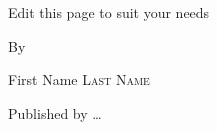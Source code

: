 \thispagestyle{empty} %

\begin{titlepage}
\null%
\vspace{3em}%
\begin{center}

\vspace*{4\baselineskip}

{\makeatletter
\huge\@title%
\makeatother}

\bigskip

{\Large Edit this page to suit your needs}

\bigskip
\bigskip

By

\makeatletter
{\large First Name {\scshape Last Name}}
\makeatother

\vfill

Published by \ldots

\end{center}
\end{titlepage}
